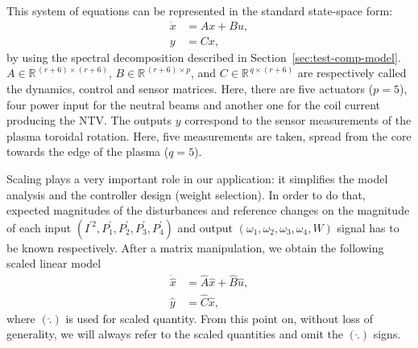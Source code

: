 \documentclass[12pt,lot, lof]{puthesis}
\begin{document}
%
This system of equations can be represented in the standard state-space form:
\begin{align}
 \dot{x} &= A x + B u ,\label{eqn:state-space1} \\
 y &= C x, \label{eqn:state-space2} 
\end{align}
by using the spectral decomposition described in Section~\ref{sec:test-comp-model}.
$A \in \mathbb{R}^{\, (r+6) \times (r+6)}$, $B \in \mathbb{R}^{\,(r+6) \times p}$, and $C \in \mathbb{R}^{\, q \times (r+6)}$ are respectively called the dynamics, control and sensor matrices.
Here, there are five actuators ($p=5$), four power input for the neutral beams and another one for the coil current producing the NTV.
The outputs $y$ correspond to the sensor measurements of the plasma toroidal rotation. Here, five measurements are taken, spread from the core towards the edge of the plasma ($q=5$).

Scaling plays a very important role in our application: it simplifies the model analysis and the controller design (weight selection). In order to do that, expected magnitudes of the disturbances and reference changes on the magnitude of each input $\left( I^{'2}, P^{'}_1, P^{'}_2, P^{'}_3, P^{'}_4 \right)$ and output $\left( \omega_1,  \omega_2,  \omega_3,  \omega_4,  W \right) $ signal has to be known respectively.
%
After a matrix manipulation, we obtain the following scaled linear model
\begin{align}
 \dot{\hat{x}} &=  \hat{A} \hat{x} + \hat{B} \hat{u} ,\label{sc-space1} \\
 \hat{y} &= \hat{C} \hat{x}, \label{sc-space2} 
\end{align}
where $\left( \hat{.} \right)$ is used for scaled quantity.
From this point on, without loss of generality, we will always refer to the scaled quantities and omit the $(\hat{.})$ signs.
\end{document}

